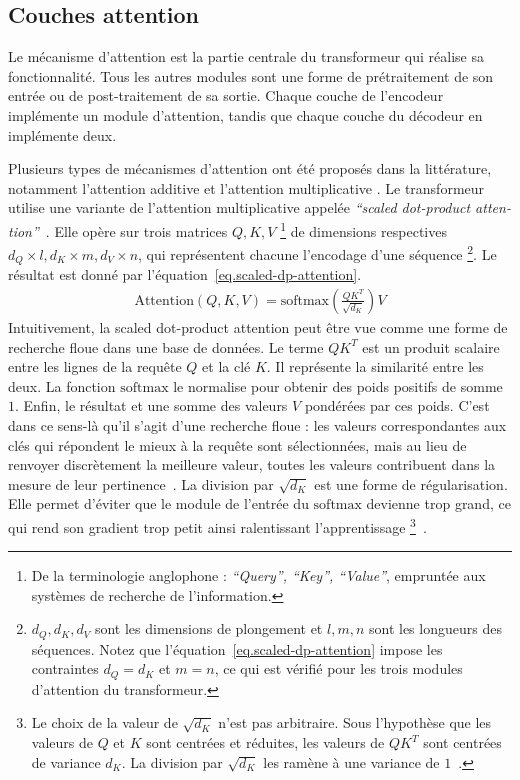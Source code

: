 \subsection{Couches attention}

Le mécanisme d'attention est la partie centrale du transformeur qui réalise sa fonctionnalité.
Tous les autres modules sont une forme de prétraitement de son entrée ou de post-traitement de sa sortie. 
Chaque couche de l'encodeur implémente un module d'attention, 
tandis que chaque couche du décodeur en implémente deux.

Plusieurs types de mécanismes d'attention ont été proposés dans la littérature,
notamment l'attention additive \cite{Bahdanau_Cho_Bengio_2016} 
et l'attention multiplicative \cite{Luong_Pham_Manning_2015}.
Le transformeur utilise une variante de l'attention multiplicative appelée 
\foreignlanguage{english}{\emph{``scaled dot-product attention''}}~\cite{attention}.
Elle opère sur trois matrices \(Q, K, V\)%
\footnote{%
    De la terminologie anglophone : \foreignlanguage{english}{\emph{``Query'', ``Key'', ``Value''}},
    empruntée aux systèmes de recherche de l'information.
} de dimensions respectives \(d_Q \times l, d_K \times m, d_V \times n\),
qui représentent chacune l'encodage d'une séquence%
\footnote{
    \(d_Q, d_K, d_V\) sont les dimensions de plongement et \(l, m, n\) sont les longueurs des séquences.
    Notez que l'équation~\eqref{eq.scaled-dp-attention} impose les contraintes \(d_Q = d_K\) et \(m = n\),
    ce qui est vérifié pour les trois modules d'attention du transformeur.
}.
Le résultat est donné par l'équation~\eqref{eq.scaled-dp-attention}.
\begin{eqnarray}
    \label{eq.scaled-dp-attention}
    \text{Attention}(Q, K, V) = \text{softmax}\left(\frac{QK^T}{\sqrt{d_K}}\right)V 
\end{eqnarray}
Intuitivement, la \foreignlanguage{english}{scaled dot-product attention} peut être vue comme 
une forme de recherche floue dans une base de données.
Le terme \(QK^T\) est un produit scalaire entre les lignes de la requête \(Q\) et la clé \(K\).
Il représente la similarité entre les deux.
La fonction \(\text{softmax}\) le normalise pour obtenir des poids positifs de somme \(1\).
Enfin, le résultat et une somme des valeurs \(V\) pondérées par ces poids.
C'est dans ce sens-là qu'il s'agit d'une recherche floue :
les valeurs correspondantes aux clés qui répondent le mieux à la requête sont sélectionnées,
mais au lieu de renvoyer discrètement la meilleure valeur, 
toutes les valeurs contribuent dans la mesure de leur pertinence~\cite{CS480/680Lecture19_2019}.
La division par \(\sqrt{d_K}\) est une forme de régularisation. 
Elle permet d'éviter que le module de l'entrée du \(\text{softmax}\) devienne trop grand,
ce qui rend son gradient trop petit ainsi ralentissant l'apprentissage%
\footnote{%
    Le choix de la valeur de \(\sqrt{d_K}\) n'est pas arbitraire.
    Sous l'hypothèse que les valeurs de \(Q\) et \(K\) sont centrées et réduites,
    les valeurs de \(QK^T\) sont centrées de variance \(d_K\).
    La division par \(\sqrt{d_K}\) les ramène à une variance de \(1\)~\cite{attention}.
}~\cite{attention}.

